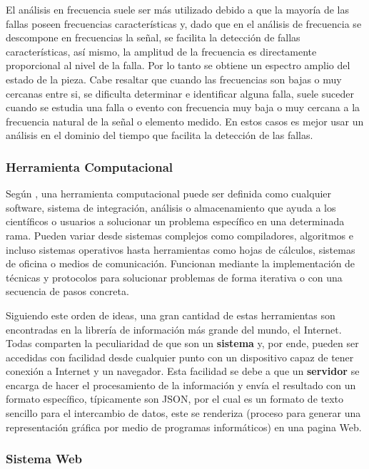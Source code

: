 El análisis en frecuencia suele ser más utilizado debido a que
la mayoría de las fallas poseen frecuencias características y, dado que en  el
análisis de frecuencia se descompone en frecuencias la señal, se facilita la
detección de fallas características, así mismo, la amplitud de la frecuencia es
directamente proporcional al nivel de la falla. Por lo tanto se obtiene un
espectro amplio del estado de la pieza.
Cabe resaltar que cuando las frecuencias son bajas o muy cercanas entre si,
se dificulta determinar e identificar alguna falla, suele suceder cuando se
estudia una falla o evento con frecuencia muy baja o muy cercana a la frecuencia
natural de la señal o elemento medido. En estos casos es mejor
usar un análisis en el dominio del tiempo que  facilita la
detección de las fallas.



\subsubsection{Herramienta Computacional}


Según \Cite{Herramienta}, una herramienta computacional puede ser definida  como
cualquier software,
sistema de integración, análisis o almacenamiento que  ayuda a los científicos
o usuarios a solucionar un problema específico en una determinada rama. Pueden
variar desde sistemas complejos como compiladores, algoritmos
e incluso sistemas operativos hasta herramientas como hojas de cálculos, sistemas
de oficina o medios de comunicación. Funcionan mediante la implementación de
técnicas y protocolos para solucionar problemas de forma iterativa o con una
secuencia de pasos concreta.

Siguiendo este orden de ideas, una gran cantidad de estas herramientas son
encontradas en la librería de información más grande del mundo, el Internet.
Todas comparten la peculiaridad de que son un \textbf{sistema} y,  por ende, pueden
ser accedidas con facilidad desde cualquier punto con un dispositivo capaz de
tener conexión a Internet y un navegador. Esta facilidad se debe a que un
\textbf{servidor} se encarga de hacer el procesamiento de la información y envía
el resultado con un formato específico, típicamente son  JSON, por  el cual es un formato de texto sencillo para el intercambio de
datos, este se renderiza (proceso para generar una representación gráfica por
medio de programas informáticos) en una pagina Web.

\subsubsection{Sistema Web}

